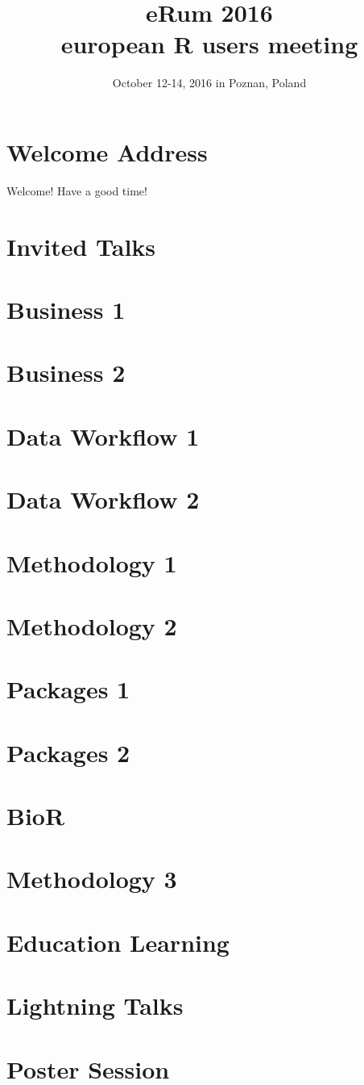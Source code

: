 \documentclass[11pt]{book}
\title{eRum 2016 \\ european R users meeting}
\author{October 12-14, 2016 in Poznan, Poland}
\date{}
\begin{document}
\frontmatter
\maketitle

\chapter{Welcome Address}
Welcome! Have a good time!

\tableofcontents

\mainmatter

\chapter{Invited Talks}




\chapter{Business 1}
\chapter{Business 2}
\chapter{Data Workflow 1}
\chapter{Data Workflow 2}
\chapter{Methodology 1}
\chapter{Methodology 2}
\chapter{Packages 1}
\chapter{Packages 2}
\chapter{BioR}
\chapter{Methodology 3}
\chapter{Education Learning}
\chapter{Lightning Talks}
\chapter{Poster Session}

\backmatter
\end{document}
